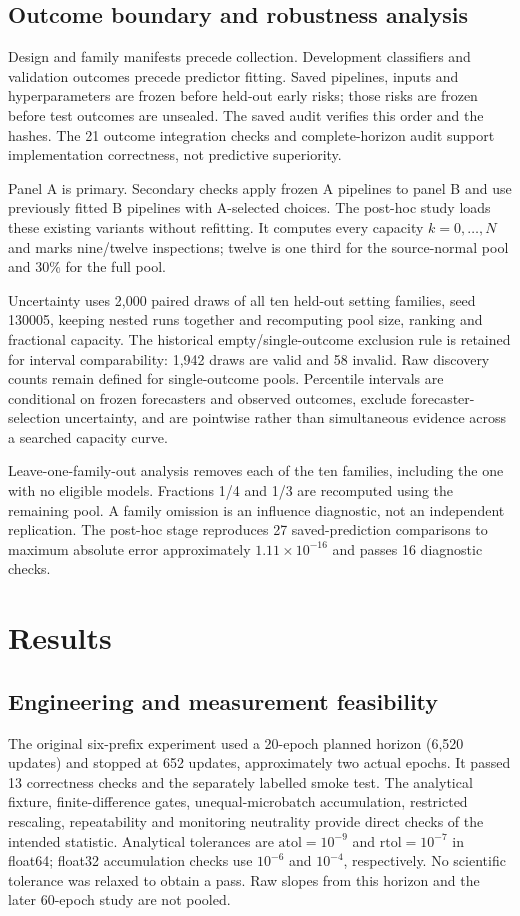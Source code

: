 \subsection{Outcome boundary and robustness analysis}
Design and family manifests precede collection. Development classifiers and validation outcomes precede predictor fitting. Saved pipelines, inputs and hyperparameters are frozen before held-out early risks; those risks are frozen before test outcomes are unsealed. The saved audit verifies this order and the hashes. The 21 outcome integration checks and complete-horizon audit support implementation correctness, not predictive superiority.

Panel A is primary. Secondary checks apply frozen A pipelines to panel B and use previously fitted B pipelines with A-selected choices. The post-hoc study loads these existing variants without refitting. It computes every capacity $k=0,\ldots,N$ and marks nine/twelve inspections; twelve is one third for the source-normal pool and 30\% for the full pool.

Uncertainty uses 2,000 paired draws of all ten held-out setting families, seed 130005, keeping nested runs together and recomputing pool size, ranking and fractional capacity. The historical empty/single-outcome exclusion rule is retained for interval comparability: 1,942 draws are valid and 58 invalid. Raw discovery counts remain defined for single-outcome pools. Percentile intervals are conditional on frozen forecasters and observed outcomes, exclude forecaster-selection uncertainty, and are pointwise rather than simultaneous evidence across a searched capacity curve.

Leave-one-family-out analysis removes each of the ten families, including the one with no eligible models. Fractions 1/4 and 1/3 are recomputed using the remaining pool. A family omission is an influence diagnostic, not an independent replication. The post-hoc stage reproduces 27 saved-prediction comparisons to maximum absolute error approximately $1.11\times10^{-16}$ and passes 16 diagnostic checks.

\section{Results}
\label{sec:results}
\subsection{Engineering and measurement feasibility}
The original six-prefix experiment used a 20-epoch planned horizon (6,520 updates) and stopped at 652 updates, approximately two actual epochs. It passed 13 correctness checks and the separately labelled smoke test. The analytical fixture, finite-difference gates, unequal-microbatch accumulation, restricted rescaling, repeatability and monitoring neutrality provide direct checks of the intended statistic. Analytical tolerances are $\mathrm{atol}=10^{-9}$ and $\mathrm{rtol}=10^{-7}$ in float64; float32 accumulation checks use $10^{-6}$ and $10^{-4}$, respectively. No scientific tolerance was relaxed to obtain a pass. Raw slopes from this horizon and the later 60-epoch study are not pooled.

